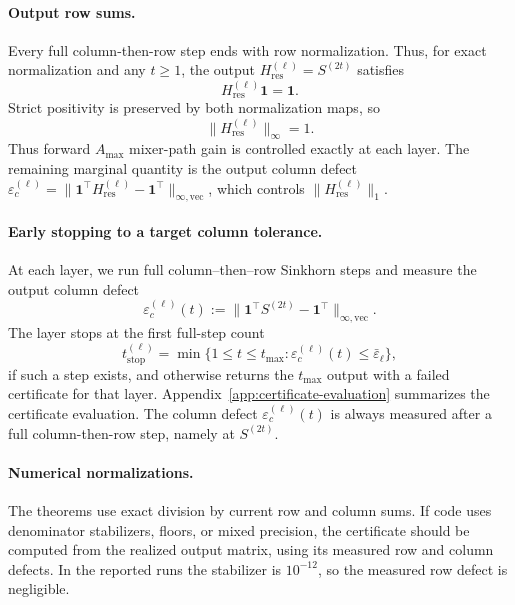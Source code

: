 \documentclass[10pt]{article}
\numberwithin{equation}{section}
\theoremstyle{plain}
\theoremstyle{definition}
\theoremstyle{remark}
\newcommand{\ones}{\mathbf{1}}
\newcommand{\Hres}{H_{\mathrm{res}}}
\begin{document}
\paragraph{Output row sums.}
Every full column-then-row step ends with row normalization. Thus, for exact
normalization and any \(t\ge1\), the output \(\Hres^{(\ell)}=S^{(2t)}\) satisfies
\begin{equation}\label{eq:output_row_exact}
\Hres^{(\ell)}\ones=\ones.
\end{equation}
Strict positivity is preserved by both normalization maps, so
\begin{equation}\label{eq:output_inf_norm_one}
\|\Hres^{(\ell)}\|_\infty=1.
\end{equation}
Thus forward \(A_{\max}\) mixer-path gain is controlled exactly at each layer. The
remaining marginal quantity is the output column defect
\(\varepsilon_c^{(\ell)}=\|\ones^\top\Hres^{(\ell)}-\ones^\top\|_{\infty,\mathrm{vec}}\),
which controls \(\|\Hres^{(\ell)}\|_1\).

\paragraph{Early stopping to a target column tolerance.}
At each layer, we run full column--then--row Sinkhorn steps and measure the
output column defect
\begin{equation}\label{eq:early-stop-measured-eps}
    \varepsilon_c^{(\ell)}(t)
    :=
    \|\ones^\top S^{(2t)}-\ones^\top\|_{\infty,\mathrm{vec}}.
\end{equation}
The layer stops at the first full-step count
\begin{equation}\label{eq:early-stop-rule}
    t_{\mathrm{stop}}^{(\ell)}
    =
    \min\{1\le t\le t_{\max}:
    \varepsilon_c^{(\ell)}(t)\le \bar\varepsilon_\ell\},
\end{equation}
if such a step exists, and otherwise returns the \(t_{\max}\) output with a failed
certificate for that layer. Appendix~\ref{app:certificate-evaluation}
summarizes the certificate evaluation. The column defect \(\varepsilon_c^{(\ell)}(t)\) is
always measured after a full column-then-row step, namely at \(S^{(2t)}\).

\paragraph{Numerical normalizations.}
The theorems use exact division by current row and column sums. If code uses
denominator stabilizers, floors, or mixed precision, the certificate should be
computed from the realized output matrix, using its measured row and column
defects. In the reported runs the stabilizer is \(10^{-12}\), so the measured row
defect is negligible.
\end{document}
